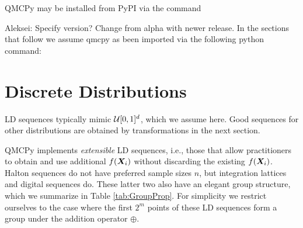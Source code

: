 \documentclass[graybox,footinfo]{svmult}
\newcommand{\AGSComment}[1]{{\color{cyan} Aleksei: #1}}
\begin{document}
QMCPy may be installed from PyPI via the command 
 
\AGSComment{Specify version? Change from alpha with newer release.}
In the sections that follow we assume qmcpy as been imported via the following python command: 


\section{Discrete Distributions}

LD sequences typically mimic ${\mathcal{U}}[0,1]^d$, which we assume here.  Good sequences for other distributions are obtained by transformations in the next section.  

QMCPy implements \emph{extensible} LD sequences, i.e., those that allow practitioners to obtain and use additional $f({\boldsymbol{X}}_i)$ without discarding the existing $f({\boldsymbol{X}}_i)$.  Halton sequences do not have preferred sample sizes $n$, but integration lattices and digital sequences do.  These latter two also have an elegant group structure, which we summarize in Table \ref{tab:GroupProp}.  For simplicity we restrict ourselves to the case where the first $2^m$ points of these LD sequences form a group under the addition operator $\oplus$.
\end{document}
